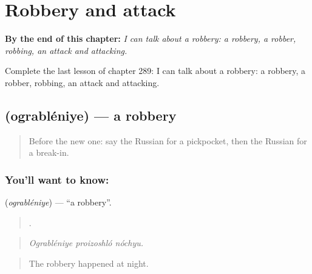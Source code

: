 
\chapter{Robbery and attack}
\label{ch:ru-robbery-and-attack}

\begin{chapteropening}
\textbf{By the end of this chapter:} \emph{I can talk about a robbery: a robbery, a robber, robbing, an attack and attacking.}

Complete the last lesson of chapter 289: I can talk about a robbery: a robbery, a robber, robbing, an attack and attacking.
\end{chapteropening}

\section[\texorpdfstring{\ru{ограбление} (ograbléniye)}{ограбление (ograbléniye)}]{ (ograbléniye) — a robbery}

\label{lesson:RU-C289-ogrableniye}



\begin{quote}
Before the new one: say the Russian for a pickpocket, then the Russian for a break-in.
\end{quote}

\subsection*{You'll want to know: }
\textbf{} (\emph{ograbléniye}) — \textquotedblleft{}a robbery\textquotedblright{}.

\begin{quote}
  .
\end{quote}

\begin{quote}
\emph{Ograbléniye proizoshló nóchyu.}
\end{quote}

\begin{quote}
The robbery happened at night.
\end{quote}

